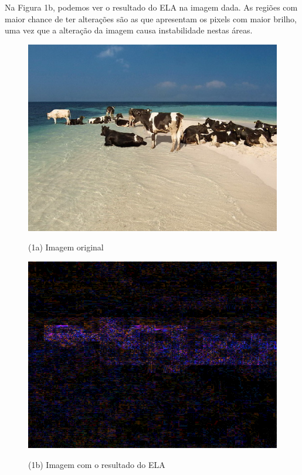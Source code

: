 \documentclass[12pt]{article}
\begin{document}
\begin{itemize}
\begin{itemize}
Na Figura 1b, podemos ver o resultado do ELA na imagem dada. As regiões com maior chance de ter
alterações são as que apresentam os pixels com maior brilho, uma vez que a alteração da imagem 
causa instabilidade nestas áreas.
\begin{figure}[htb]
\centering
\begin{minipage}[b]{0.45\textwidth}
	\centering
        \includegraphics[scale=0.3]{Q3Images/cows_on_beach.jpg} 
	\centerline{\label{fig1a} \small (1a) Imagem original}
\end{minipage}
\begin{minipage}[b]{0.45\textwidth}
	\centering
        \includegraphics[scale=0.3]{Q3Images/cows_on_beach_ela.png} 
	\centerline{\label{fig1b} \small (1b) Imagem com o resultado do ELA}
\end{minipage}
\end{figure}


\end{itemize}
\end{itemize}
\end{document}
